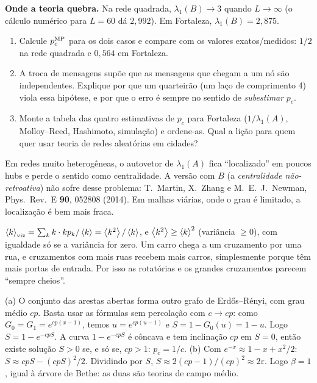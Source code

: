 \documentclass[11pt]{article}
\begin{document}
 \textbf{Onde a teoria quebra.} Na rede quadrada, $\lambda_1(B)\to3$ quando $L\to\infty$ (o cálculo numérico para $L=60$ dá $2{,}992$). Em Fortaleza, $\lambda_1(B) = 2{,}875$.
\begin{enumerate}
  \item Calcule $p_c^{\rm MP}$ para os dois casos e compare com os valores exatos/medidos: $1/2$ na rede quadrada e $0{,}564$ em Fortaleza.
  \item A troca de mensagens supõe que as mensagens que chegam a um nó são independentes. Explique por que um quarteirão (um laço de comprimento 4) viola essa hipótese, e por que o erro é sempre no sentido de \emph{subestimar} $p_c$.
  \item Monte a tabela das quatro estimativas de $p_c$ para Fortaleza ($1/\lambda_1(A)$, Molloy--Reed, Hashimoto, simulação) e ordene-as. Qual a lição para quem quer usar teoria de redes aleatórias em cidades?
\end{enumerate}

\begin{obs}
Em redes muito heterogêneas, o autovetor de $\lambda_1(A)$ fica ``localizado'' em poucos hubs e perde o sentido como centralidade. A versão com $B$ (a \emph{centralidade não-retroativa}) não sofre desse problema: T.~Martin, X.~Zhang e M.~E.~J.~Newman, Phys.\ Rev.\ E \textbf{90}, 052808 (2014). Em malhas viárias, onde o grau é limitado, a localização é bem mais fraca.
\end{obs}

\solucoes

$\left\langle k \right\rangle_{\rm viz} = \sum_k k\cdot kp_k/\left\langle k \right\rangle = \left\langle k^2 \right\rangle/\left\langle k \right\rangle$, e $\left\langle k^2 \right\rangle\ge\left\langle k \right\rangle^2$ (variância $\ge0$), com igualdade só se a variância for zero. Um carro chega a um cruzamento por uma rua, e cruzamentos com mais ruas recebem mais carros, simplesmente porque têm mais portas de entrada. Por isso as rotatórias e os grandes cruzamentos parecem ``sempre cheios''.

(a) O conjunto das arestas abertas forma outro grafo de Erdős--Rényi, com grau médio $cp$. Basta usar as fórmulas sem percolação com $c\to cp$: como $G_0=G_1 = e^{cp(x-1)}$, temos $u = e^{cp(u-1)}$ e $S = 1-G_0(u) = 1-u$. Logo $S = 1-e^{-cpS}$. A curva $1-e^{-cpS}$ é côncava e tem inclinação $cp$ em $S=0$, então existe solução $S>0$ se, e só se, $cp>1$: $p_c = 1/c$.
(b) Com $e^{-x}\approx1-x+x^2/2$: $S\approx cpS-(cpS)^2/2$. Dividindo por $S$, $S\approx2(cp-1)/(cp)^2\approx2\varepsilon$. Logo $\beta = 1$, igual à árvore de Bethe: as duas são teorias de campo médio.
\end{document}
